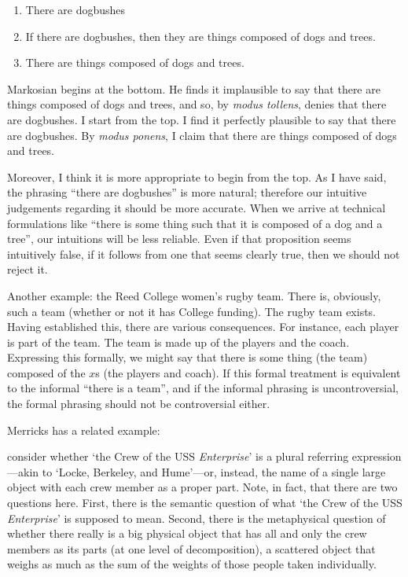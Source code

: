 \documentclass[11pt]{article}
\newenvironment{squote}{%
\begin{spacing}{1}
       	\begin{list}{}{%
\setlength{\labelwidth}{0pt}%
\rightmargin\leftmargin%
}
\item\relax
}{%
\end{list}%
\end{spacing}
}
\begin{document}
\begin{spacing}{1.25}
\begin{enumerate}
  \item There are dogbushes
  \item If there are dogbushes, then they are things composed of dogs
    and trees.
  \item There are things composed of dogs and trees.
\end{enumerate}

Markosian begins at the bottom.  He finds it implausible to say that
there are things composed of dogs and trees, and so, by {\em modus
  tollens}, denies that there are dogbushes.  I start from the top.  I
find it perfectly plausible to say that there are dogbushes.  By {\em
  modus ponens}, I claim that there are things composed of dogs and
trees.

Moreover, I think it is more appropriate to begin from the top.  As I
have said, the phrasing ``there are dogbushes'' is more natural;
therefore our intuitive judgements regarding it should be more
accurate.  When we arrive at technical formulations like ``there is
some thing such that it is composed of a dog and a tree'', our
intuitions will be less reliable.  Even if that proposition seems
intuitively false, if it follows from one that seems clearly true,
then we should not reject it.

Another example: the Reed College women's rugby team.  There is,
obviously, such a team (whether or not it has College funding).  The
rugby team exists.  Having established this, there are various
consequences.  For instance, each player is part of the team.  The
team is made up of the players and the coach.  Expressing this
formally, we might say that there is some thing (the team) composed of
the $x$s (the players and coach).  If this formal treatment is
equivalent to the informal ``there is a team'', and if the informal
phrasing is uncontroversial, the formal phrasing should not be
controversial either.

Merricks has a related  example:

\begin{squote}
consider whether `the Crew of the USS {\em Enterprise}' is a plural
referring expression---akin to `Locke, Berkeley, and Hume'---or,
instead, the name of a single large object with each crew member as a
proper part.  Note, in fact, that there are two questions here.
First, there is the semantic question of what `the Crew of the USS
{\em Enterprise}' is supposed to mean.  Second, there is the
metaphysical question of whether there really is a big physical object
that has all and only the crew members as its parts (at one level of
decomposition), a scattered object that weighs as much as the sum of
the weights of those people taken individually.


\end{squote}
\end{spacing}
\end{document}
